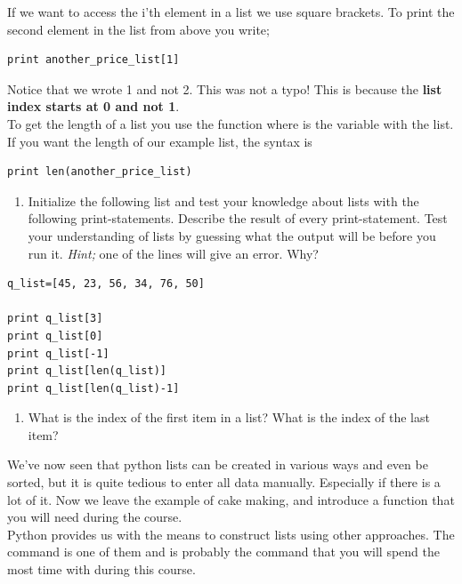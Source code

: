 \documentclass{article}
\begin{document}

If we want to access the i'th element in a list
we use square brackets. To print the second element
in the list from above you write;

\begin{lstlisting}
print another_price_list[1]
\end{lstlisting}

Notice that we wrote 1 and not 2. This was not a typo!
This is because the {\bf{list index starts at 0 and not 1}}.\\

To get the length of a list you use the function 
where  is the variable with the list.
If you want the length of our example list, the syntax is

\begin{lstlisting}
print len(another_price_list)
\end{lstlisting}

\begin{enumerate}[resume]
  \item Initialize the following list and test your knowledge about
    lists with the following print-statements.
    Describe the result of every print-statement. Test your
    understanding of lists by guessing what the output will be before
    you run it. 
    {\em Hint;} one of the lines will give an error. Why?
\end{enumerate}
\begin{lstlisting}
q_list=[45, 23, 56, 34, 76, 50]

print q_list[3]
print q_list[0]
print q_list[-1]
print q_list[len(q_list)]
print q_list[len(q_list)-1]
\end{lstlisting}

\begin{enumerate}[resume]
  \item What is the index of the first item in a list? What is the index of
    the last item?

\end{enumerate}

We've now seen that python lists can be created in various ways and even be
sorted, but it is quite tedious to enter all data manually. Especially if
there is a lot of it. Now we leave the example of cake making, and introduce a function that you will need during the course. \\

Python provides us with the means to construct
lists using other approaches.
The  command is one of them and is probably the
command that you will spend the most time with during this course.
\end{document}
